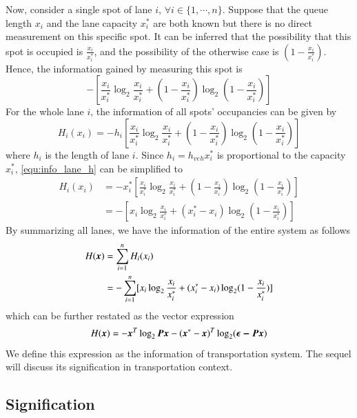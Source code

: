 \documentclass[preprint,authoryear,12pt]{elsarticle}
\renewcommand{\vec}[1]{\mbox{\boldmath$#1$}}
\newcommand{\mat}[1]{\mbox{\boldmath$#1$}}
\begin{document}
Now, consider a single spot of lane $i$, $\forall i\in\{1,\cdots,n\}$. Suppose that the queue length $x_i$ and the lane capacity $x_i^*$ are both known but there is no direct measurement on this specific spot. It can be inferred that the possibility that this spot is occupied is $\frac{x_i}{x_i^*}$, and the possibility of the otherwise case is $(1-\frac{x_i}{x_i^*})$. Hence, the information gained by measuring this spot is
$$-[\frac{x_i}{x_i^*} \log_2 \frac{x_i}{x_i^*}+(1-\frac{x_i}{x_i^*})
\log_2 (1-\frac{x_i}{x_i^*})]
$$
For the whole lane $i$, the information of all spots' occupancies can be given by
\begin{equation}\label{equ:info_lane_h}
H_i(x_i) = -h_i[\frac{x_i}{x_i^*} \log_2
\frac{x_i}{x_i^*}+(1-\frac{x_i}{x_i^*}) \log_2 (1-\frac{x_i}{x_i^*})]
\end{equation}
where $h_i$ is the length of lane $i$. Since $h_i=h_{veh} x_i^*$ is proportional to the capacity $x_i^*$, \eqref{equ:info_lane_h} can be simplified to
\begin{align}
H_i(x_i) &= -x_i^*[\frac{x_i}{x_i^*} \log_2
\frac{x_i}{x_i^*}+(1-\frac{x_i}{x_i^*}) \log_2
(1-\frac{x_i}{x_i^*})] \nonumber\\
&=-[x_i \log_2 \frac{x_i}{x_i^*}+(x_i^*-x_i) \log_2
(1-\frac{x_i}{x_i^*})] \label{equ:info_lane}
\end{align}
By summarizing all lanes, we have the information of the entire system as follows
\begin{align}
H(\vec{x}) &= \sum_{i=1}^n H_i(x_i)\nonumber\\
&= - \sum_{i=1}^n [x_i \log_2 \frac{x_i}{x_i^*}+(x_i^*-x_i) \log_2
(1-\frac{x_i}{x_i^*})]\label{equ:info_network_sum}
\end{align}
which can be further restated as the vector expression
\begin{equation}\label{equ:info}
H(\vec{x}) = -\vec{x}^T\log_2\mat{P}\vec{x}
-(\vec{x}^*-\vec{x})^T\log_2(\vec{\epsilon-\mat{P}\vec{x}})
\end{equation}
We define this expression as the information of transportation system. The sequel will discuss its signification in transportation context.

\subsection{Signification}
\end{document}
